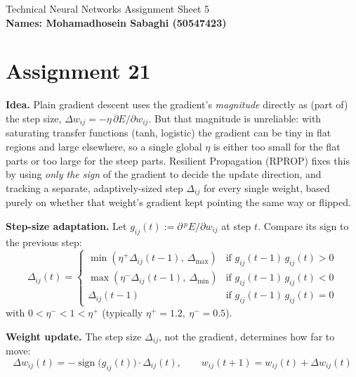 \documentclass[11pt,a4paper]{article}
\begin{document}
\begin{center}
{\large Technical Neural Networks Assignment Sheet 5}\\[4pt]
{\bfseries Names: Mohamadhosein Sabaghi (50547423)}
\end{center}

\section*{Assignment 21}

\textbf{Idea.} Plain gradient descent uses the gradient's \emph{magnitude} directly as (part of) the
step size, $\Delta w_{ij}=-\eta\,\partial E/\partial w_{ij}$. But that magnitude is unreliable: with
saturating transfer functions (tanh, logistic) the gradient can be tiny in flat regions and large
elsewhere, so a single global $\eta$ is either too small for the flat parts or too large for the steep
parts. Resilient Propagation (RPROP) fixes this by using \emph{only the sign} of the gradient to decide
the update direction, and tracking a separate, adaptively-sized step $\Delta_{ij}$ for every single
weight, based purely on whether that weight's gradient kept pointing the same way or flipped.

\textbf{Step-size adaptation.} Let $g_{ij}(t):=\partial\,{}^pE/\partial w_{ij}$ at step $t$. Compare its
sign to the previous step:
\[
  \Delta_{ij}(t) =
  \begin{cases}
    \min(\eta^{+}\Delta_{ij}(t-1),\ \Delta_{\max}) & \text{if } g_{ij}(t-1)\,g_{ij}(t) > 0 \\
    \max(\eta^{-}\Delta_{ij}(t-1),\ \Delta_{\min}) & \text{if } g_{ij}(t-1)\,g_{ij}(t) < 0 \\
    \Delta_{ij}(t-1) & \text{if } g_{ij}(t-1)\,g_{ij}(t) = 0
  \end{cases}
\]
with $0<\eta^{-}<1<\eta^{+}$ (typically $\eta^+=1.2,\ \eta^-=0.5$).

\textbf{Weight update.} The step size $\Delta_{ij}$, not the gradient, determines how far to move:
\[
  \Delta w_{ij}(t) = -\operatorname{sign}\!\big(g_{ij}(t)\big)\cdot \Delta_{ij}(t), \qquad
  w_{ij}(t+1) = w_{ij}(t) + \Delta w_{ij}(t)
\]
\end{document}
